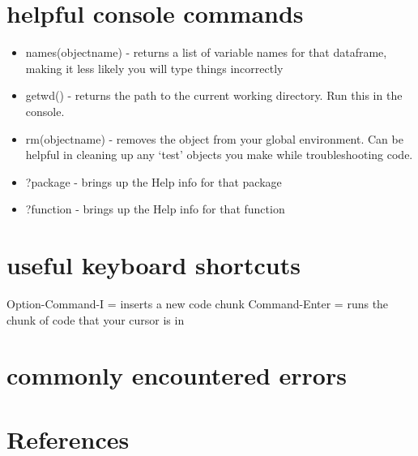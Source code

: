 \documentclass[
  letterpaper,
  DIV=11,
  numbers=noendperiod]{scrreprt}
\providecommand{\tightlist}{%
  \setlength{\itemsep}{0pt}\setlength{\parskip}{0pt}}\usepackage{longtable,booktabs,array}
\newlength{\cslhangindent}
\newenvironment{CSLReferences}[2] %
 {\begin{list}{}{%
  \setlength{\itemindent}{0pt}
  \setlength{\leftmargin}{0pt}
  \setlength{\parsep}{0pt}
  \ifodd #1
   \setlength{\leftmargin}{\cslhangindent}
   \setlength{\itemindent}{-1\cslhangindent}
  \fi
  \setlength{\itemsep}{#2\baselineskip}}}
 {\end{list}}
\begin{document}

\chapter{helpful console commands}\label{helpful-console-commands}

\begin{itemize}
\tightlist
\item
  names(objectname) - returns a list of variable names for that
  dataframe, making it less likely you will type things incorrectly
\item
  getwd() - returns the path to the current working directory. Run this
  in the console.
\item
  rm(objectname) - removes the object from your global environment. Can
  be helpful in cleaning up any `test' objects you make while
  troubleshooting code.
\item
  ?package - brings up the Help info for that package
\item
  ?function - brings up the Help info for that function
\end{itemize}


\chapter{useful keyboard shortcuts}\label{useful-keyboard-shortcuts}

Option-Command-I = inserts a new code chunk Command-Enter = runs the
chunk of code that your cursor is in


\chapter{commonly encountered errors}\label{commonly-encountered-errors}


\chapter*{References}\label{references}


\label{refs}
\begin{CSLReferences}{0}{1}
\end{CSLReferences}
\end{document}
